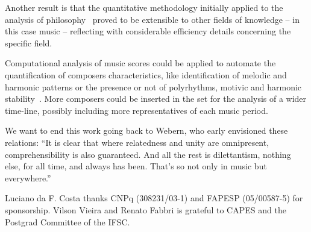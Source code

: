 \documentclass[
 aip,
 jmp,
 amsmath,amssymb,
 reprint,
]{revtex4-1}
\begin{document}
Another result is that the quantitative methodology initially applied to the analysis of philosophy~\cite{Fabbri}
proved to be extensible to other fields of knowledge -- in this case music --
reflecting with considerable efficiency details concerning the specific field. 

Computational analysis of music scores could be
applied to automate the quantification of composers characteristics, like
identification of melodic and harmonic patterns or the presence or not of
polyrhythms, motivic and harmonic stability~\cite{Correa}. More composers could be
inserted in the set for the analysis of a wider time-line, possibly
including more representatives of each music period.


We want to end this work going back to Webern,
who early envisioned these relations: ``It is clear that where relatedness and unity are omnipresent,
comprehensibility is also guaranteed. And all the rest is
dilettantism, nothing else, for all time, and always has been. That's
so not only in music but everywhere.''

\begin{acknowledgments}
Luciano da F. Costa thanks CNPq (308231/03-1) and FAPESP (05/00587-5)
for sponsorship. Vilson Vieira and Renato Fabbri is grateful to CAPES and 
the Postgrad Committee of the IFSC.
\end{acknowledgments}

\nocite{*}

\end{document}
